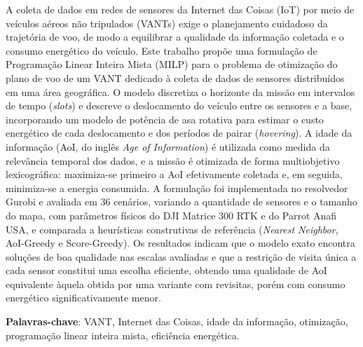 \documentclass[
    12pt,
    oneside,
    a4paper,
    brazil
]{abntex2}
\begin{document}
    \pretextual
    

    \begin{resumo}
        A coleta de dados em redes de sensores da Internet das Coisas (IoT) por meio de veículos aéreos não tripulados (VANTs) exige o planejamento cuidadoso da trajetória de voo, de modo a equilibrar a qualidade da informação coletada e o consumo energético do veículo. Este trabalho propõe uma formulação de Programação Linear Inteira Mista (MILP) para o problema de otimização do plano de voo de um VANT dedicado à coleta de dados de sensores distribuídos em uma área geográfica. O modelo discretiza o horizonte da missão em intervalos de tempo (\textit{slots}) e descreve o deslocamento do veículo entre os sensores e a base, incorporando um modelo de potência de asa rotativa para estimar o custo energético de cada deslocamento e dos períodos de pairar (\textit{hovering}). A idade da informação (AoI, do inglês \textit{Age of Information}) é utilizada como medida da relevância temporal dos dados, e a missão é otimizada de forma multiobjetivo lexicográfica: maximiza-se primeiro a AoI efetivamente coletada e, em seguida, minimiza-se a energia consumida. A formulação foi implementada no resolvedor Gurobi e avaliada em 36 cenários, variando a quantidade de sensores e o tamanho do mapa, com parâmetros físicos do DJI Matrice 300 RTK e do Parrot Anafi USA, e comparada a heurísticas construtivas de referência (\textit{Nearest Neighbor}, AoI-Greedy e Score-Greedy). Os resultados indicam que o modelo exato encontra soluções de boa qualidade nas escalas avaliadas e que a restrição de visita única a cada sensor constitui uma escolha eficiente, obtendo uma qualidade de AoI equivalente àquela obtida por uma variante com revisitas, porém com consumo energético significativamente menor.

        \vspace{\onelineskip}
        \noindent\textbf{Palavras-chave}: VANT, Internet das Coisas, idade da informação, otimização, programação linear inteira mista, eficiência energética.
    \end{resumo}

    \tableofcontents*

    \textual

    


    

    
 
    
    
\end{document}
